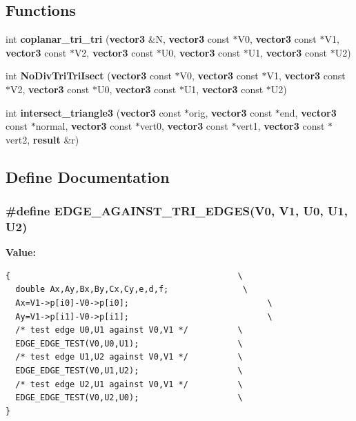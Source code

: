 \subsection*{Functions}
\begin{CompactItemize}
\item 
int {\bf coplanar\_\-tri\_\-tri} ({\bf vector3} \&N, {\bf vector3} const $\ast$V0, {\bf vector3} const $\ast$V1, {\bf vector3} const $\ast$V2, {\bf vector3} const $\ast$U0, {\bf vector3} const $\ast$U1, {\bf vector3} const $\ast$U2)
\item 
int {\bf No\-Div\-Tri\-Tri\-Isect} ({\bf vector3} const $\ast$V0, {\bf vector3} const $\ast$V1, {\bf vector3} const $\ast$V2, {\bf vector3} const $\ast$U0, {\bf vector3} const $\ast$U1, {\bf vector3} const $\ast$U2)
\item 
int {\bf intersect\_\-triangle3} ({\bf vector3} const $\ast$orig, {\bf vector3} const $\ast$end, {\bf vector3} const $\ast$normal, {\bf vector3} const $\ast$vert0, {\bf vector3} const $\ast$vert1, {\bf vector3} const $\ast$vert2, {\bf result} \&r)
\end{CompactItemize}


\subsection{Define Documentation}
\subsubsection{\setlength{\rightskip}{0pt plus 5cm}\#define EDGE\_\-AGAINST\_\-TRI\_\-EDGES(V0, V1, U0, U1, U2)}\label{opttritri_8h_831bfa37e6247abd79136fbd5c5ebee3}


\textbf{Value:}

\begin{Code}\begin{verbatim}{                                              \
  double Ax,Ay,Bx,By,Cx,Cy,e,d,f;               \
  Ax=V1->p[i0]-V0->p[i0];                            \
  Ay=V1->p[i1]-V0->p[i1];                            \
  /* test edge U0,U1 against V0,V1 */          \
  EDGE_EDGE_TEST(V0,U0,U1);                    \
  /* test edge U1,U2 against V0,V1 */          \
  EDGE_EDGE_TEST(V0,U1,U2);                    \
  /* test edge U2,U1 against V0,V1 */          \
  EDGE_EDGE_TEST(V0,U2,U0);                    \
}
\end{verbatim}\end{Code}
